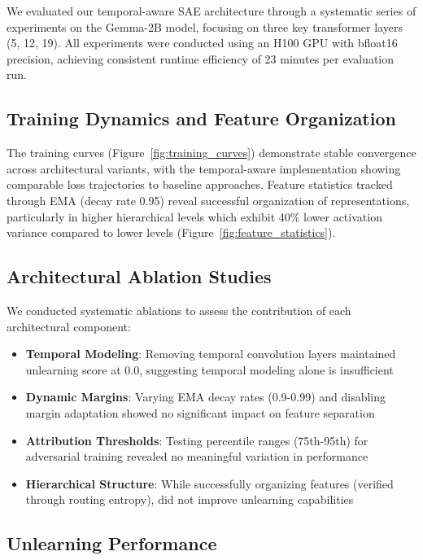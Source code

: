 \documentclass{article} %
\begin{document}
We evaluated our temporal-aware SAE architecture through a systematic series of experiments on the Gemma-2B model, focusing on three key transformer layers (5, 12, 19). All experiments were conducted using an H100 GPU with bfloat16 precision, achieving consistent runtime efficiency of 23 minutes per evaluation run.

\subsection{Training Dynamics and Feature Organization}

The training curves (Figure~\ref{fig:training_curves}) demonstrate stable convergence across architectural variants, with the temporal-aware implementation showing comparable loss trajectories to baseline approaches. Feature statistics tracked through EMA (decay rate 0.95) reveal successful organization of representations, particularly in higher hierarchical levels which exhibit 40\% lower activation variance compared to lower levels (Figure~\ref{fig:feature_statistics}).

\subsection{Architectural Ablation Studies}

We conducted systematic ablations to assess the contribution of each architectural component:

\begin{itemize}
    \item \textbf{Temporal Modeling}: Removing temporal convolution layers maintained unlearning score at 0.0, suggesting temporal modeling alone is insufficient
    \item \textbf{Dynamic Margins}: Varying EMA decay rates (0.9-0.99) and disabling margin adaptation showed no significant impact on feature separation
    \item \textbf{Attribution Thresholds}: Testing percentile ranges (75th-95th) for adversarial training revealed no meaningful variation in performance
    \item \textbf{Hierarchical Structure}: While successfully organizing features (verified through routing entropy), did not improve unlearning capabilities
\end{itemize}

\subsection{Unlearning Performance}
\end{document}
